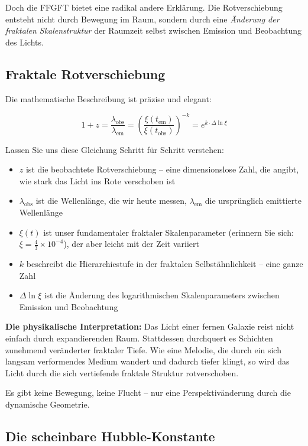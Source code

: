 \documentclass[12pt,a4paper]{article}
\begin{document}
Doch die FFGFT bietet eine radikal andere Erklärung. Die Rotverschiebung entsteht nicht durch Bewegung im Raum, sondern durch eine \textit{Änderung der fraktalen Skalenstruktur} der Raumzeit selbst zwischen Emission und Beobachtung des Lichts.

\subsection{Fraktale Rotverschiebung}

Die mathematische Beschreibung ist präzise und elegant:

\begin{equation}
1 + z = \frac{\lambda_{\text{obs}}}{\lambda_{\text{em}}} = \left(\frac{\xi(t_{\text{em}})}{\xi(t_{\text{obs}})}\right)^{-k} = e^{k \cdot \Delta \ln \xi}
\end{equation}

Lassen Sie uns diese Gleichung Schritt für Schritt verstehen:

\begin{itemize}[leftmargin=*]
\item $z$ ist die beobachtete Rotverschiebung -- eine dimensionslose Zahl, die angibt, wie stark das Licht ins Rote verschoben ist
\item $\lambda_{\text{obs}}$ ist die Wellenlänge, die wir heute messen, $\lambda_{\text{em}}$ die ursprünglich emittierte Wellenlänge
\item $\xi(t)$ ist unser fundamentaler fraktaler Skalenparameter (erinnern Sie sich: $\xi = \frac{4}{3} \times 10^{-4}$), der aber leicht mit der Zeit variiert
\item $k$ beschreibt die Hierarchiestufe in der fraktalen Selbstähnlichkeit -- eine ganze Zahl
\item $\Delta \ln \xi$ ist die Änderung des logarithmischen Skalenparameters zwischen Emission und Beobachtung
\end{itemize}

\textbf{Die physikalische Interpretation:} Das Licht einer fernen Galaxie reist nicht einfach durch expandierenden Raum. Stattdessen durchquert es Schichten zunehmend veränderter fraktaler Tiefe. Wie eine Melodie, die durch ein sich langsam verformendes Medium wandert und dadurch tiefer klingt, so wird das Licht durch die sich vertiefende fraktale Struktur rotverschoben.

Es gibt keine Bewegung, keine Flucht -- nur eine Perspektivänderung durch die dynamische Geometrie.

\subsection{Die scheinbare Hubble-Konstante}
\end{document}
